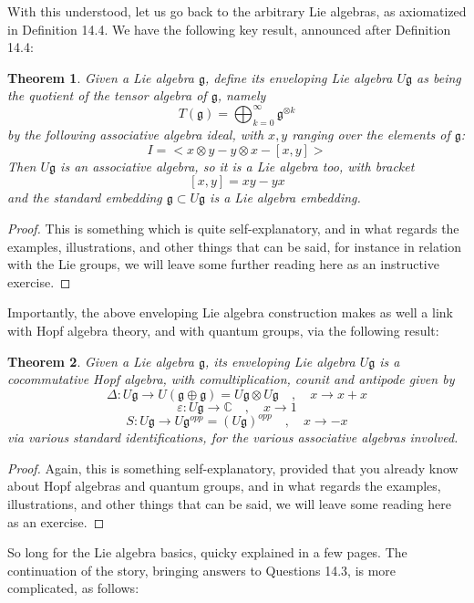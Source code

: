 \documentclass[12pt]{amsbook}
\newtheorem{theorem}{Theorem}[chapter]
\begin{document}
With this understood, let us go back to the arbitrary Lie algebras, as axiomatized in Definition 14.4.  We have the following key result, announced after Definition 14.4:

\begin{theorem}
Given a Lie algebra $\mathfrak g$, define its enveloping Lie algebra $U\mathfrak g$ as being the quotient of the tensor algebra of $\mathfrak g$, namely
$$T(\mathfrak g)=\bigoplus_{k=0}^\infty\mathfrak g^{\otimes k}$$
by the following associative algebra ideal, with $x,y$ ranging over the elements of $\mathfrak g$:
$$I=<x\otimes y-y\otimes x-[x,y]>$$
Then $U\mathfrak g$ is an associative algebra, so it is a Lie algebra too, with bracket 
$$[x,y]=xy-yx$$
and the standard embedding $\mathfrak g\subset U\mathfrak g$ is a Lie algebra embedding.\end{theorem}

\begin{proof}
This is something which is quite self-explanatory, and in what regards the examples, illustrations, and other things that can be said, for instance in relation with the Lie groups, we will leave some further reading here as an instructive exercise.
\end{proof}

Importantly, the above enveloping Lie algebra construction makes as well a link with Hopf algebra theory, and with quantum groups, via the following result:

\begin{theorem}
Given a Lie algebra $\mathfrak g$, its enveloping Lie algebra $U\mathfrak g$ is a cocommutative Hopf algebra, with comultiplication, counit and antipode given by
$$\Delta:U\mathfrak g\to U(\mathfrak g\oplus\mathfrak g)=U\mathfrak g\otimes U\mathfrak g\quad,\quad x\to x+x$$
$$\varepsilon:U\mathfrak g\to\mathbb C\quad,\quad x\to 1$$
$$S:U\mathfrak g\to U\mathfrak g^{opp}=(U\mathfrak g)^{opp}\quad,\quad x\to-x$$
via various standard identifications, for the various associative algebras involved.
\end{theorem}

\begin{proof}
Again, this is something self-explanatory, provided that you already know about Hopf algebras and quantum groups, and in what regards the examples, illustrations, and other things that can be said, we will leave some reading here as an exercise.
\end{proof}

So long for the Lie algebra basics, quicky explained in a few pages. The continuation of the story, bringing answers to Questions 14.3, is more complicated, as follows:
\end{document}
